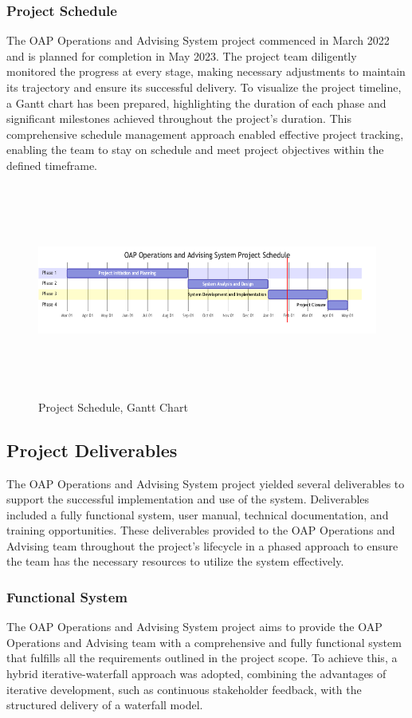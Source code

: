 \documentclass[12pt]{article}
\begin{document}
\subsubsection{Project Schedule}
The OAP Operations and Advising System project commenced in March 2022 and is planned for completion in May 2023. The project team diligently monitored the progress at every stage, making necessary adjustments to maintain its trajectory and ensure its successful delivery. To visualize the project timeline, a Gantt chart has been prepared, highlighting the duration of each phase and significant milestones achieved throughout the project's duration. This comprehensive schedule management approach enabled effective project tracking, enabling the team to stay on schedule and meet project objectives within the defined timeframe.

\begin{figure}[ht]
    \centering
    \includegraphics[width=16.5cm, height=7cm]{project-gnatt-chart}
    \caption{Project Schedule, Gantt Chart}
    \label{fig:project-schedule}
\end{figure}

\subsection{Project Deliverables}
The OAP Operations and Advising System project yielded several deliverables to support the successful implementation and use of the system. Deliverables included a fully functional system, user manual, technical documentation, and training opportunities. These deliverables provided to the OAP Operations and Advising team throughout the project's lifecycle in a phased approach to ensure the team has the necessary resources to utilize the system effectively.

\subsubsection{Functional System} 
The OAP Operations and Advising System project aims to provide the OAP Operations and Advising team with a comprehensive and fully functional system that fulfills all the requirements outlined in the project scope. To achieve this, a hybrid iterative-waterfall approach was adopted, combining the advantages of iterative development, such as continuous stakeholder feedback, with the structured delivery of a waterfall model.
\end{document}
